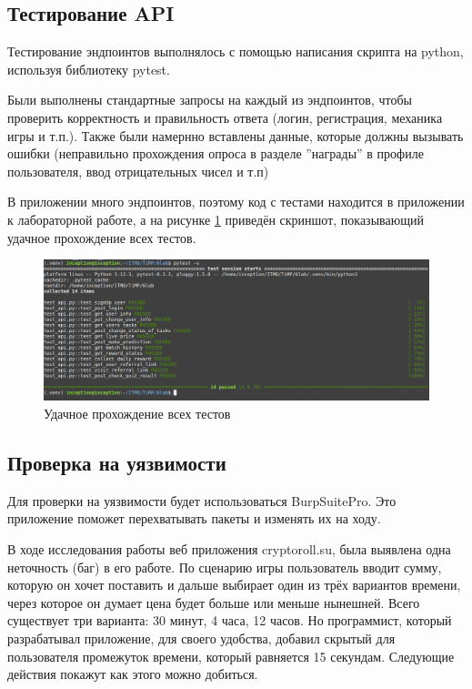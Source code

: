 \documentclass[a4paper, 12pt]{article}
\begin{document}
\subsection{Тестирование API}

Тестирование эндпоинтов  выполнялось с помощью написания скрипта на python, используя библиотеку pytest.

Были выполнены стандартные запросы на каждый из эндпоинтов, чтобы проверить корректность и правильность ответа (логин, регистрация, механика игры и т.п.). Также были намернно вставлены данные, которые должны вызывать ошибки (неправильно прохождения опроса в разделе ''награды'' в профиле пользователя, ввод отрицательных чисел и т.п)

В приложении много эндпоинтов, поэтому код с тестами находится в приложении к лабораторной работе, а на рисунке \ref{fig:api_test} приведён скриншот, показывающий удачное прохождение всех тестов.

\begin{figure}[h!]
    \noindent
    \centering
    \includegraphics[width=1\linewidth]{pic_api_test.png}
    \caption{Удачное прохождение всех тестов}
    \label{fig:api_test}
\end{figure}

\subsection{Проверка на уязвимости}
Для проверки на уязвимости будет использоваться BurpSuitePro. Это приложение поможет перехватывать пакеты и изменять их на ходу.

В ходе исследования работы веб приложения cryptoroll.su, была выявлена одна неточность (баг) в его работе. По сценарию игры пользователь вводит сумму, которую он хочет поставить и дальше выбирает один из трёх вариантов времени, через которое он думает цена будет больше или меньше нынешней. Всего существует три варианта: 30 минут, 4 часа, 12 часов. Но программист, который разрабатывал приложение, для своего удобства, добавил скрытый для пользователя промежуток времени, который равняется 15 секундам. Следующие действия покажут как этого можно добиться.
\end{document}
